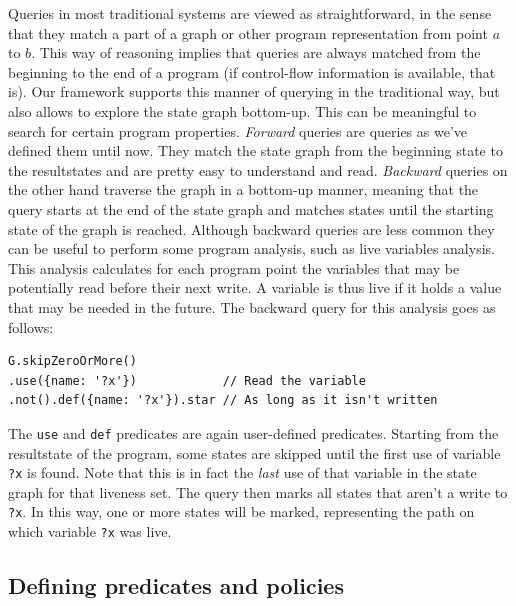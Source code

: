 Queries in most traditional systems are viewed as straightforward, in the sense that they match a part of a graph or other program representation from point $a$ to $b$. This way of reasoning implies that queries are always matched from the beginning to the end of a program (if control-flow information is available, that is). Our framework supports this manner of querying in the traditional way, but also allows to explore the state graph bottom-up. This can be meaningful to search for certain program properties. \textit{Forward} queries are queries as we've defined them until now. They match the state graph from the beginning state to the resultstates and are pretty easy to understand and read. \textit{Backward} queries on the other hand traverse the graph in a bottom-up manner, meaning that the query starts at the end of the state graph and matches states until the starting state of the graph is reached. Although backward queries are less common they can be useful to perform some program analysis, such as live variables analysis. This analysis calculates for each program point the variables that may be potentially read before their next write. A variable is thus live if it holds a value that may be needed in the future. The backward query for this analysis goes as follows:

\begin{lstlisting}[label={lst:Liveness},language=JSQL, caption=Live variables anlysis in JS-QL,mathescape=true]
G.skipZeroOrMore()
.use({name: '?x'})            // Read the variable 
.not().def({name: '?x'}).star // As long as it isn't written
\end{lstlisting}

The \texttt{use} and \texttt{def} predicates are again user-defined predicates. Starting from the resultstate of the program, some states are skipped until the first use of variable \texttt{?x} is found. Note that this is in fact the \textit{last} use of that variable in the state graph for that liveness set. The query then marks all states that aren't a write to \texttt{?x}. In this way, one or more states will be marked, representing the path on which variable \texttt{?x} was live.

\subsection{Defining predicates and policies}
\label{subsec:DefiningPolicies}

